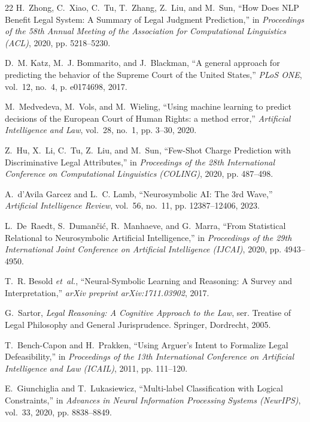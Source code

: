\documentclass[conference]{IEEEtran}
\begin{document}
\begin{thebibliography}{22}
H.~Zhong, C.~Xiao, C.~Tu, T.~Zhang, Z.~Liu, and M.~Sun, ``How Does NLP Benefit Legal System: A Summary of Legal Judgment Prediction,'' in \emph{Proceedings of the 58th Annual Meeting of the Association for Computational Linguistics (ACL)}, 2020, pp. 5218--5230.

D.~M. Katz, M.~J. Bommarito, and J.~Blackman, ``A general approach for predicting the behavior of the Supreme Court of the United States,'' \emph{PLoS ONE}, vol.~12, no.~4, p. e0174698, 2017.

M.~Medvedeva, M.~Vols, and M.~Wieling, ``Using machine learning to predict decisions of the European Court of Human Rights: a method error,'' \emph{Artificial Intelligence and Law}, vol.~28, no.~1, pp. 3--30, 2020.

Z.~Hu, X.~Li, C.~Tu, Z.~Liu, and M.~Sun, ``Few-Shot Charge Prediction with Discriminative Legal Attributes,'' in \emph{Proceedings of the 28th International Conference on Computational Linguistics (COLING)}, 2020, pp. 487--498.

A.~d'Avila Garcez and L.~C. Lamb, ``Neurosymbolic AI: The 3rd Wave,'' \emph{Artificial Intelligence Review}, vol.~56, no.~11, pp. 12387--12406, 2023.

L.~De~Raedt, S.~Duman\v{c}i\'{c}, R.~Manhaeve, and G.~Marra, ``From Statistical Relational to Neurosymbolic Artificial Intelligence,'' in \emph{Proceedings of the 29th International Joint Conference on Artificial Intelligence (IJCAI)}, 2020, pp. 4943--4950.

T.~R. Besold \emph{et~al.}, ``Neural-Symbolic Learning and Reasoning: A Survey and Interpretation,'' \emph{arXiv preprint arXiv:1711.03902}, 2017.

G.~Sartor, \emph{Legal Reasoning: A Cognitive Approach to the Law}, ser. Treatise of Legal Philosophy and General Jurisprudence. Springer, Dordrecht, 2005.

T.~Bench-Capon and H.~Prakken, ``Using Arguer's Intent to Formalize Legal Defeasibility,'' in \emph{Proceedings of the 13th International Conference on Artificial Intelligence and Law (ICAIL)}, 2011, pp. 111--120.

E.~Giunchiglia and T.~Lukasiewicz, ``Multi-label Classification with Logical Constraints,'' in \emph{Advances in Neural Information Processing Systems (NeurIPS)}, vol.~33, 2020, pp. 8838--8849.


\end{thebibliography}
\end{document}
